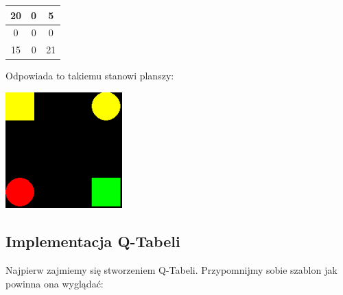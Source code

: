 \documentclass[a4paper,12pt]{article}
\begin{document}
\begin{center}
\begin{tabular}{ |c|c|c| }
\hline
20 & 0 & 5 \\
\hline
0 & 0 & 0 \\
\hline
15 & 0 & 21 \\
\hline
\end{tabular}
\newline
\end{center} 

Odpowiada to takiemu stanowi planszy:

\includegraphics[width=45mm]{przyklad3.png}

\subsection{Implementacja Q-Tabeli}

Najpierw zajmiemy się stworzeniem Q-Tabeli. Przypomnijmy sobie szablon jak powinna ona wyglądać:
\end{document}
